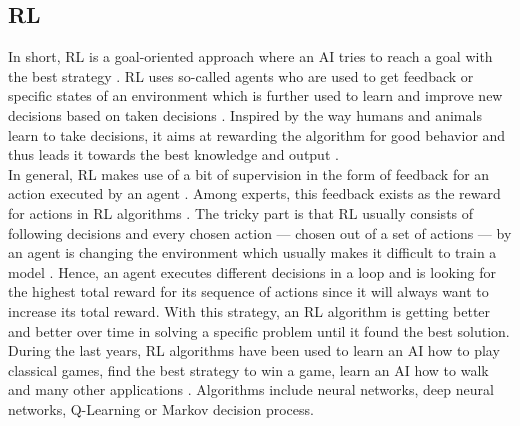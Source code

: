 \documentclass[MGS,Master,english]{twbook}%
\begin{document}
\subsection{\acl{RL}}
In short, \ac{RL} is a goal-oriented approach where an AI tries to reach a goal with the best strategy \cite{ml::book::developer}. RL uses so-called agents who are used to get feedback or specific states of an environment which is further used to learn and improve new decisions based on taken decisions \cite{ml::book::developer}. Inspired by the way humans and animals learn to take decisions, it aims at rewarding the algorithm for good behavior and thus leads it towards the best knowledge and output \cite{ai::book}. \\
In general, RL makes use of a bit of supervision in the form of feedback for an action executed by an agent \cite{ml::book::statistics}. Among experts, this feedback exists as the reward for actions in RL algorithms \cite{ml::book::statistics}.  The tricky part is that RL usually consists of following decisions and every chosen action — chosen out of a set of actions — by an agent is changing the environment which usually makes it difficult to train a model \cite{ml::book::statistics}. Hence, an agent executes different decisions in a loop and is looking for the highest total reward for its sequence of actions since it will always want to increase its total reward. \cite{ai::book} With this strategy, an RL algorithm is getting better and better over time in solving a specific problem until it found the best solution.\\
During the last years, RL algorithms have been used to learn an AI how to play classical games, find the best strategy to win a game, learn an AI how to walk and many other applications \cite{ml::book::algorithms}. Algorithms include neural networks, deep neural networks, Q-Learning or Markov decision process. \cite{ml::book::statistics}
\end{document}
